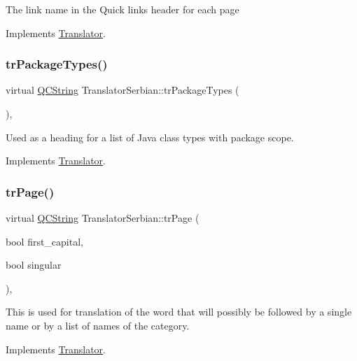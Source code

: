 The link name in the Quick links header for each page 

Implements \mbox{\hyperlink{class_translator}{Translator}}.

\mbox{\label{class_translator_serbian_a5c3cfd2a264033012d3181fca9e92388}} 
\subsubsection{\texorpdfstring{trPackageTypes()}{trPackageTypes()}}
{\footnotesize\ttfamily virtual \mbox{\hyperlink{class_q_c_string}{Q\+C\+String}} Translator\+Serbian\+::tr\+Package\+Types (\begin{DoxyParamCaption}{ }\end{DoxyParamCaption})\hspace{0.3cm}{\ttfamily [inline]}, {\ttfamily [virtual]}}

Used as a heading for a list of Java class types with package scope. 

Implements \mbox{\hyperlink{class_translator}{Translator}}.

\mbox{\label{class_translator_serbian_ac8d6bf1f73f589304b5ef733bccf12a2}} 
\subsubsection{\texorpdfstring{trPage()}{trPage()}}
{\footnotesize\ttfamily virtual \mbox{\hyperlink{class_q_c_string}{Q\+C\+String}} Translator\+Serbian\+::tr\+Page (\begin{DoxyParamCaption}\item[{bool}]{first\+\_\+capital,  }\item[{bool}]{singular }\end{DoxyParamCaption})\hspace{0.3cm}{\ttfamily [inline]}, {\ttfamily [virtual]}}

This is used for translation of the word that will possibly be followed by a single name or by a list of names of the category. 

Implements \mbox{\hyperlink{class_translator}{Translator}}.

